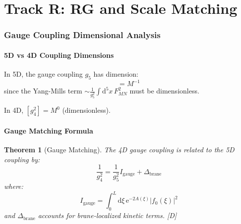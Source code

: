 \documentclass[11pt,a4paper]{article}
\newtheorem{theorem}{Theorem}[section]
\newcommand{\dd}{\mathrm{d}}
\newcommand{\ee}{\mathrm{e}}
\begin{document}
\part{Track R: RG and Scale Matching}

\section{Gauge Coupling Dimensional Analysis}
\label{sec:gauge-dim}

\subsection{5D vs 4D Coupling Dimensions}

In 5D, the gauge coupling $g_5$ has dimension:
\begin{equation}
[g_5^2] = M^{-1}
\label{eq:g5-dim}
\end{equation}
since the Yang-Mills term $\sim \frac{1}{g_5^2}\int \dd^5x\, F_{MN}^2$ must be dimensionless.

In 4D, $[g_4^2] = M^0$ (dimensionless).

\subsection{Gauge Matching Formula}

\begin{theorem}[Gauge Matching]
\label{thm:gauge-match}
The 4D gauge coupling is related to the 5D coupling by:
\begin{equation}
\boxed{
\frac{1}{g_4^2} = \frac{1}{g_5^2} I_{\text{gauge}} + \Delta_{\text{brane}}
}
\label{eq:gauge-match}
\end{equation}
where:
\begin{equation}
I_{\text{gauge}} = \int_0^L \dd\xi\, \ee^{-2A(\xi)} |f_0(\xi)|^2
\label{eq:i-gauge}
\end{equation}
and $\Delta_{\text{brane}}$ accounts for brane-localized kinetic terms. [D]
\end{theorem}
\end{document}
